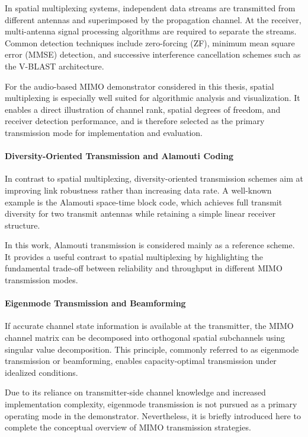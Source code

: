 In spatial multiplexing systems, independent data streams are transmitted from different antennas and superimposed by the propagation channel. At the receiver, multi-antenna signal processing algorithms are required to separate the streams. Common detection techniques include zero-forcing (ZF), minimum mean square error (MMSE) detection, and successive interference cancellation schemes such as the V-BLAST architecture.

For the audio-based MIMO demonstrator considered in this thesis, spatial multiplexing is especially well suited for algorithmic analysis and visualization. It enables a direct illustration of channel rank, spatial degrees of freedom, and receiver detection performance, and is therefore selected as the primary transmission mode for implementation and evaluation.

\paragraph{Diversity-Oriented Transmission and Alamouti Coding}

In contrast to spatial multiplexing, diversity-oriented transmission schemes aim at improving link robustness rather than increasing data rate. A well-known example is the Alamouti space-time block code, which achieves full transmit diversity for two transmit antennas while retaining a simple linear receiver structure.

In this work, Alamouti transmission is considered mainly as a reference scheme. It provides a useful contrast to spatial multiplexing by highlighting the fundamental trade-off between reliability and throughput in different MIMO transmission modes.

\paragraph{Eigenmode Transmission and Beamforming}

If accurate channel state information is available at the transmitter, the MIMO channel matrix can be decomposed into orthogonal spatial subchannels using singular value decomposition. This principle, commonly referred to as eigenmode transmission or beamforming, enables capacity-optimal transmission under idealized conditions.

Due to its reliance on transmitter-side channel knowledge and increased implementation complexity, eigenmode transmission is not pursued as a primary operating mode in the demonstrator. Nevertheless, it is briefly introduced here to complete the conceptual overview of MIMO transmission strategies.

